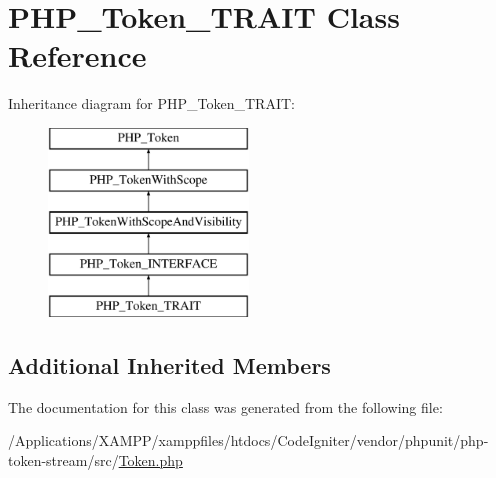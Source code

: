 \hypertarget{class_p_h_p___token___t_r_a_i_t}{}\section{P\+H\+P\+\_\+\+Token\+\_\+\+T\+R\+A\+IT Class Reference}
\label{class_p_h_p___token___t_r_a_i_t}
Inheritance diagram for P\+H\+P\+\_\+\+Token\+\_\+\+T\+R\+A\+IT\+:\begin{figure}[H]
\begin{center}
\leavevmode
\includegraphics[height=5.000000cm]{class_p_h_p___token___t_r_a_i_t}
\end{center}
\end{figure}
\subsection*{Additional Inherited Members}


The documentation for this class was generated from the following file\+:\begin{DoxyCompactItemize}
\item 
/\+Applications/\+X\+A\+M\+P\+P/xamppfiles/htdocs/\+Code\+Igniter/vendor/phpunit/php-\/token-\/stream/src/\mbox{\hyperlink{_token_8php}{Token.\+php}}\end{DoxyCompactItemize}
